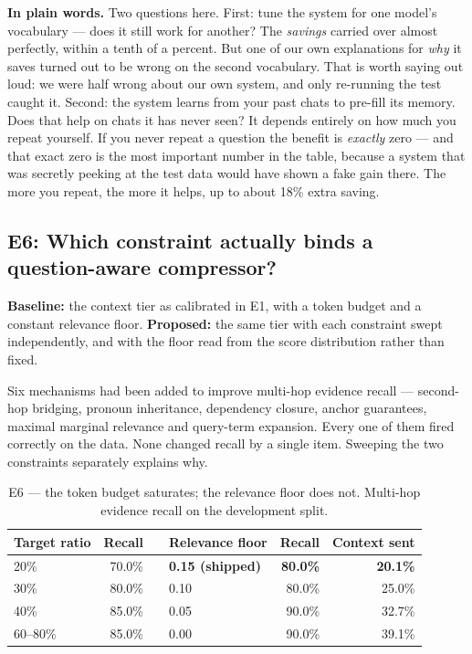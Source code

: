\documentclass[11pt,a4paper]{article}
\newcommand{\plain}[1]{%
  \par\vspace{1pt}
  \noindent\begin{tcolorbox}[colback=plainblue,colframe=plainrule,boxrule=0pt,
    leftrule=2.2pt,arc=0pt,left=7pt,right=5pt,top=4pt,bottom=4pt,breakable]
  \small\textbf{In plain words.} #1
  \end{tcolorbox}\par\vspace{2pt}}
\begin{document}
\plain{Two questions here. First: tune the system for one model's vocabulary ---
does it still work for another? The \emph{savings} carried over almost perfectly,
within a tenth of a percent. But one of our own explanations for \emph{why} it
saves turned out to be wrong on the second vocabulary. That is worth saying out
loud: we were half wrong about our own system, and only re-running the test caught
it. Second: the system learns from your past chats to pre-fill its memory. Does
that help on chats it has never seen? It depends entirely on how much you repeat
yourself. If you never repeat a question the benefit is \emph{exactly} zero --- and
that exact zero is the most important number in the table, because a system that
was secretly peeking at the test data would have shown a fake gain there. The more
you repeat, the more it helps, up to about 18\% extra saving.}

\subsection{E6: Which constraint actually binds a question-aware compressor?}
\label{sec:e6}

\textbf{Baseline:} the context tier as calibrated in E1, with a token budget
and a constant relevance floor. \textbf{Proposed:} the same tier with each
constraint swept independently, and with the floor read from the score
distribution rather than fixed.

Six mechanisms had been added to improve multi-hop evidence recall --- second-hop
bridging, pronoun inheritance, dependency closure, anchor guarantees, maximal
marginal relevance and query-term expansion. Every one of them fired correctly on
the data. None changed recall by a single item. Sweeping the two constraints
separately explains why.

\begin{table}[htbp]
\centering
\caption{E6 --- the token budget saturates; the relevance floor does not.
Multi-hop evidence recall on the development split.}
\label{tab:floor-vs-budget}
\footnotesize
\begin{tabular}{@{}l r c l r r@{}}
\toprule
\textbf{Target ratio} & \textbf{Recall} & & \textbf{Relevance floor} &
\textbf{Recall} & \textbf{Context sent} \\
\midrule
20\%      & 70.0\% & & \textbf{0.15 (shipped)} & \textbf{80.0\%} & \textbf{20.1\%} \\
30\%      & 80.0\% & & 0.10                    & 80.0\%          & 25.0\% \\
40\%      & 85.0\% & & 0.05                    & 90.0\%          & 32.7\% \\
60--80\%  & 85.0\% & & 0.00                    & 90.0\%          & 39.1\% \\
\bottomrule
\end{tabular}
\end{table}
\end{document}
